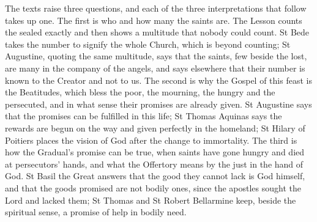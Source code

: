 The texts raise three questions, and each of the three interpretations that
follow takes up one. The first is who and how many the saints are. The Lesson
counts the sealed exactly and then shows a multitude that nobody could count.
St Bede takes the number to signify the whole Church, which is beyond
counting; St Augustine, quoting the same multitude, says that the saints, few
beside the lost, are many in the company of the angels, and says elsewhere
that their number is known to the Creator and not to us. The second is why the
Gospel of this feast is the Beatitudes, which bless the poor, the mourning, the
hungry and the persecuted, and in what sense their promises are already given.
St Augustine says that the promises can be fulfilled in this life; St Thomas
Aquinas says the rewards are begun on the way and given perfectly in the
homeland; St Hilary of Poitiers places the vision of God after the change to
immortality. The third is how the Gradual's promise can be true, when saints
have gone hungry and died at persecutors' hands, and what the Offertory means
by the just in the hand of God. St Basil the Great answers that the good they
cannot lack is God himself, and that the goods promised are not bodily ones,
since the apostles sought the Lord and lacked them; St Thomas and St Robert
Bellarmine keep, beside the spiritual sense, a promise of help in bodily
need.

